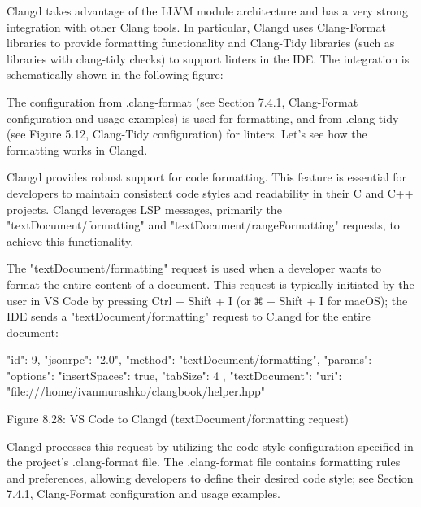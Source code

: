 Clangd takes advantage of the LLVM module architecture and has a very strong integration with other Clang tools. In particular, Clangd uses Clang-Format libraries to provide formatting functionality and Clang-Tidy libraries (such as libraries with clang-tidy checks) to support linters in the IDE. The integration is schematically shown in the following figure:


The configuration from .clang-format (see Section 7.4.1, Clang-Format configuration and usage examples) is used for formatting, and from .clang-tidy (see Figure 5.12, Clang-Tidy configuration) for linters. Let's see how the formatting works in Clangd.



Clangd provides robust support for code formatting. This feature is essential for developers to maintain consistent code styles and readability in their C and C++ projects. Clangd leverages LSP messages, primarily the "textDocument/formatting" and "textDocument/rangeFormatting" requests, to achieve this functionality.


The "textDocument/formatting" request is used when a developer wants to format the entire content of a document. This request is typically initiated by the user in VS Code by pressing Ctrl + Shift + I (or  \includegraphics[width=0.02\textwidth]{content/part2/chapter8/images/3.png} + Shift + I for macOS); the IDE sends a "textDocument/formatting" request to Clangd for the entire document:

\begin{shell}
{
  "id": 9,
  "jsonrpc": "2.0",
  "method": "textDocument/formatting",
  "params": {
    "options": {
      "insertSpaces": true,
      "tabSize": 4
    },
    "textDocument": {
      "uri": "file:///home/ivanmurashko/clangbook/helper.hpp"
    }
  }
}
\end{shell}


\begin{center}
Figure 8.28: VS Code to Clangd (textDocument/formatting request)
\end{center}

Clangd processes this request by utilizing the code style configuration specified in the project's .clang-format file. The .clang-format file contains formatting rules and preferences, allowing developers to define their desired code style; see Section 7.4.1, Clang-Format configuration and usage examples.

